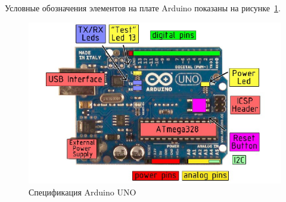 Условные обозначения элементов на плате Arduino показаны на рисунке~\ref{fig:specuno}.

\begin{figure}[ht]
    \includegraphics[width=.8\linewidth]{Figures/specuno.png}
    \caption{Спецификация Arduino UNO}
    \label{fig:specuno}
\end{figure}
